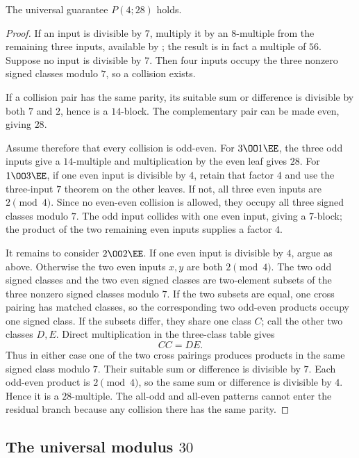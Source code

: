 \begin{theorem}\label{thm:p28}
The universal guarantee $P(4;28)$ holds.
\end{theorem}
\begin{proof}
If an input is divisible by $7$, multiply it by an $8$-multiple from the
remaining three inputs, available by ; the result is in fact
a multiple of $56$.  Suppose no input is divisible by $7$.  Then four inputs
occupy the three nonzero signed classes modulo $7$, so a collision exists.

If a collision pair has the same parity, its suitable sum or difference is
divisible by both $7$ and $2$, hence is a $14$-block.  The complementary pair
can be made even, giving $28$.

Assume therefore that every collision is odd-even.  For $3\OO1\EE$, the
three odd inputs give a $14$-multiple and multiplication by the even leaf
gives $28$.  For $1\OO3\EE$, if one even input is divisible by $4$, retain
that factor $4$ and use the three-input $7$ theorem on the other leaves.  If
not, all three even inputs are $2\pmod4$.  Since no even-even collision is
allowed, they occupy all three signed classes modulo $7$.  The odd input
collides with one even input, giving a $7$-block; the product of the two
remaining even inputs supplies a factor $4$.

It remains to consider $2\OO2\EE$.  If one even input is divisible by $4$,
argue as above.  Otherwise the two even inputs $x,y$ are both $2\pmod4$.
The two odd signed classes and the two even signed classes are two-element
subsets of the three nonzero signed classes modulo $7$.  If the two subsets
are equal, one cross pairing has matched classes, so the corresponding two
odd-even products occupy one signed class.  If the subsets differ, they
share one class $C$; call the other two classes $D,E$.  Direct multiplication
in the three-class table gives
\[
 C C = D E.
\]
Thus in either case one of the two cross pairings produces products in the
same signed class modulo $7$.  Their suitable sum or difference is divisible
by $7$.  Each odd-even product is $2\pmod4$, so the same sum or difference is
divisible by $4$.  Hence it is a $28$-multiple.  The all-odd and all-even
patterns cannot enter the residual branch because any collision there has
the same parity.
\end{proof}

\subsection{\texorpdfstring{The universal modulus $30$}{The universal modulus 30}}\label{app:p30}

